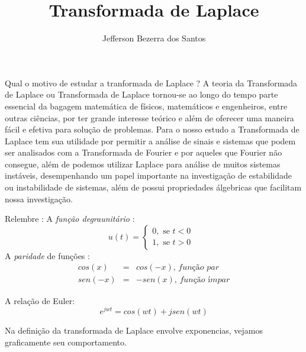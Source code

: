 \documentclass[9pt]{beamer}
\title {Transformada de Laplace}
\author{Jefferson Bezerra dos Santos}
\begin{document}
\begin{frame}
  \maketitle
\end{frame}
\begin{frame}{Qual  o motivo de estudar a tranformada de Laplace ?}
  \justifying
  A teoria da Transformada de Laplace ou Transformada de Laplace tornou-se ao longo do tempo parte essencial da bagagem matem\'{a}tica de f\'{i}sicos, matem\'{a}ticos e engenheiros, entre outras ci\^{e}ncias,
  por ter grande interesse te\'{o}rico e al\'{e}m de oferecer uma maneira f\'{a}cil e efetiva para solu\c{c}\~{a}o de problemas. Para o nosso estudo a Transformada de Laplace tem sua utilidade por permitir  a an\'{a}lise
  de sinais e sistemas que podem ser analisados com a Transformada de Fourier e por aqueles que Fourier n\~{a}o consegue, al\'{e}m  de podemos utilizar Laplace para  an\'{a}lise de muitos  sistemas inst\'{a}veis,
  desempenhando  um papel importante na investiga\c{c}\~{a}o de estabilidade ou instabilidade de sistemas, al\'{e}m  de possui propriedades \'{a}lgebricas que facilitam nossa investiga\c{c}\~{a}o.
\end{frame}
\begin{frame}{Relembre :}
  \justifying
  A  \textit{fun\c{c}\~{a}o degraunit\'{a}rio} : 
  \begin{displaymath}
    u(t) = \left \{\begin{array}{ll}
      0, \textrm { se $t < 0$ } \\
      1, \textrm { se $t > $0}
      	\end{array} \right.
  \end{displaymath}
   A \textit{paridade} de fun\c{c}\~{o}es :
   \begin{eqnarray}
     cos (x) & = & cos(-x), \, \textit{fun\c{c}\~{a}o par} \nonumber \\
     sen(-x) & = & -sen(x), \, \textit{fun\c{c}\~{a}o \'{i}mpar} \nonumber
   \end{eqnarray}
   \par
   A rela\c{c}\~{a}o de Euler:
   $$ e^{jwt} = cos(wt) + j sen(wt)$$
   \par
   Na defini\c{c}\~{a}o  da transformada de Laplace envolve exponencias, vejamos graficamente seu comportamento.
   \begin{figure}[!htpb]
   \end{figure}
\end{frame}
\end{document}

